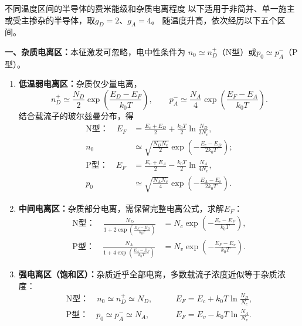 \begin{theorem}{不同温度区间的半导体的费米能级和杂质电离程度}
    以下适用于非简并、单一施主或受主掺杂的半导体，取$g_D=2$、$g_A=4$。
    随温度升高，依次经历以下五个区间。

    \textbf{一、杂质电离区：}本征激发可忽略，电中性条件为
    $n_0\simeq n_D^+$（N型）或$p_0\simeq p_A^-$（P型）。
    \begin{enumerate}
        \item \textbf{低温弱电离区：}杂质仅少量电离，
        \[
        n_D^+\simeq\frac{N_D}{2}\exp\!\left(\frac{E_D-E_F}{k_0T}\right),
        \qquad
        p_A^-\simeq\frac{N_A}{4}\exp\!\left(\frac{E_F-E_A}{k_0T}\right).
        \]
        结合载流子的玻尔兹曼分布，得
        \begin{align*}
            \text{N型：}\quad E_F&=\frac{E_c+E_D}{2}+\frac{k_0T}{2}\ln\frac{N_D}{2N_c},\\
            n_0&\simeq\sqrt{\frac{N_DN_c}{2}}\exp\!\left(-\frac{E_c-E_D}{2k_0T}\right);\\
            \text{P型：}\quad E_F&=\frac{E_v+E_A}{2}-\frac{k_0T}{2}\ln\frac{N_A}{4N_v},\\
            p_0&\simeq\sqrt{\frac{N_AN_v}{4}}\exp\!\left(-\frac{E_A-E_v}{2k_0T}\right).
        \end{align*}

        \item \textbf{中间电离区：}杂质部分电离，需保留完整电离公式，求解$E_F$：
        \begin{align*}
            \text{N型：}\quad
            \frac{N_D}{1+2\exp\!\left(\frac{E_F-E_D}{k_0T}\right)}
            &=N_c\exp\!\left(-\frac{E_c-E_F}{k_0T}\right),\\
            \text{P型：}\quad
            \frac{N_A}{1+4\exp\!\left(\frac{E_A-E_F}{k_0T}\right)}
            &=N_v\exp\!\left(-\frac{E_F-E_v}{k_0T}\right).
        \end{align*}

        \item \textbf{强电离区（饱和区）：}杂质近乎全部电离，多数载流子浓度近似等于杂质浓度：
        \begin{align*}
            \text{N型：}\quad n_0\simeq n_D^+\simeq N_D,
            &\qquad E_F=E_c+k_0T\ln\frac{N_D}{N_c},\\
            \text{P型：}\quad p_0\simeq p_A^-\simeq N_A,
            &\qquad E_F=E_v-k_0T\ln\frac{N_A}{N_v}.
        \end{align*}
    \end{enumerate}


\end{theorem}
